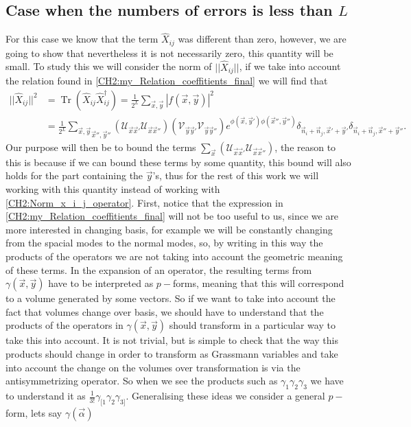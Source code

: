 \subsection{Case when the numbers of errors is less than $L$}
 For this case we know that the term $\hat{X}_{ij}$ was different than zero, however, we are going to show that nevertheless it is not necessarily zero, this quantity will be small. To study this we will consider the norm of $||\hat{X}_{ij}||$, if we take into account the relation found in \eqref{CH2:my_Relation_coeffitients_final} we will find that
\begin{equation}
\begin{aligned}
||\hat{X}_{ij}||^{2}&=\operatorname{Tr}\left(\hat{X}_{ij} \hat{X}^{\dagger}_{ij}\right) = \frac{1}{2^L}\sum_{\vec{x},\vec{y}}|f(\vec{x},\vec{y})|^2\\
&=\frac{1}{2^L}\underset{\vec{x}'',\vec{y}''}{\sum_{\vec{x},\vec{y}}}\left(	\mathcal{U}_{\vec{x}\vec{x}'} \mathcal{U}_{\vec{x}\vec{x}''}\right) \left(	\mathcal{V}_{\vec{y}\vec{y}'} \mathcal{V}_{\vec{y}\vec{y}''}\right) e^{\phi(\vec{x},\vec{y}')\phi(\vec{x}'',\vec{y}'')}\delta_{\vec{n}_i+\vec{n}_j,\vec{x}'+\vec{y}'}\delta_{\vec{n}_i+\vec{n}_j,\vec{x}''+\vec{y}''}.
\end{aligned}
\label{CH2:Norm_x_i_j_operator}
\end{equation}
Our purpose will then be to bound the terms $\sum_{\vec{x}}\left(	\mathcal{U}_{\vec{x}\vec{x}'} \mathcal{U}_{\vec{x}\vec{x}''}\right)$, the reason to this is because if we can bound these terms by some quantity, this bound will also holds for the part containing the $\vec{y}$'s, thus for the rest of this work we will working with this quantity instead of working with \eqref{CH2:Norm_x_i_j_operator}. First, notice that the expression in \eqref{CH2:my_Relation_coeffitients_final} will not be too useful to us, since we are more interested in changing basis, for example we will be constantly changing from the spacial modes to the normal modes, so, by writing in this way the products of the operators we are not taking into account the geometric meaning of these terms. In the expansion of an operator, the resulting terms from $\gamma(\vec{x},\vec{y})$ have to be interpreted as $p-$forms, meaning that this will correspond to a volume generated by some vectors. So if we want to take into account the fact that volumes change over basis, we should have to understand that the products of the operators in $\gamma(\vec{x},\vec{y})$ should transform in a particular way to take this into account. It is not trivial, but is simple to check that the way this products should change in order to transform as Grassmann variables and take into account the change on the volumes over transformation is via the antisymmetrizing operator. So when we see the products such as $\gamma_{1}\gamma_{2}\gamma_{3}$ we have to understand it as $\frac{1}{3!}\gamma_{[1}\gamma_2\gamma_{3]}$. Generalising these ideas we consider a general $p-$form, lets say $\gamma(\vec{\alpha})$
